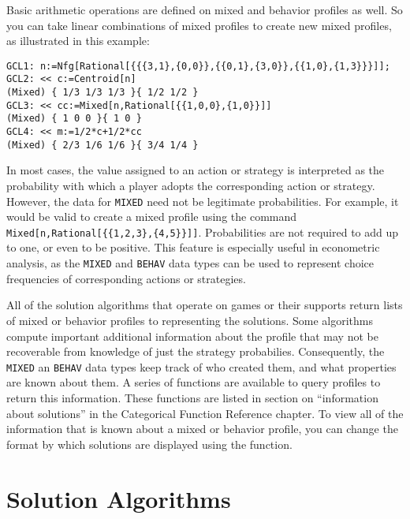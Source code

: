Basic arithmetic operations are defined on mixed and behavior profiles
as well.  So you can take linear combinations of mixed profiles to
create new mixed profiles, as illustrated in this example:

\begin{verbatim}  
GCL1: n:=Nfg[Rational[{{{3,1},{0,0}},{{0,1},{3,0}},{{1,0},{1,3}}}]];
GCL2: << c:=Centroid[n]
(Mixed) { 1/3 1/3 1/3 }{ 1/2 1/2 }
GCL3: << cc:=Mixed[n,Rational[{{1,0,0},{1,0}}]]
(Mixed) { 1 0 0 }{ 1 0 }
GCL4: << m:=1/2*c+1/2*cc
(Mixed) { 2/3 1/6 1/6 }{ 3/4 1/4 }
\end{verbatim}

In most cases, the value assigned to an action or strategy is
interpreted as the probability with which a player adopts the
corresponding action or strategy.  However, the data for \verb+MIXED+
need not be legitimate probabilities.  For example, it would be valid
to create a mixed profile using the command
\verb+Mixed[n,Rational[{{1,2,3},{4,5}}]]+.  Probabilities are not
required to add up to one, or even to be positive.  This feature is
especially useful in econometric analysis, as the \verb+MIXED+ and
\verb+BEHAV+ data types can be used to represent choice frequencies of
corresponding actions or strategies.  

All of the solution algorithms that operate on games or their supports
return lists of mixed or behavior profiles to representing the
solutions.  Some algorithms compute important additional information
about the profile that may not be recoverable from knowledge of just
the strategy probabilies.  Consequently, the \verb+MIXED+ an
\verb+BEHAV+ data types keep track of who created them, and what
properties are known about them.  A series of functions are available
to query profiles to return this information.  These functions are
listed in section on ``information about solutions'' in the
Categorical Function Reference chapter.  To view all of the
information that is known about a mixed or behavior profile, you can
change the format by which solutions are displayed using the
 function.

\section{Solution Algorithms}

\subsection{}

